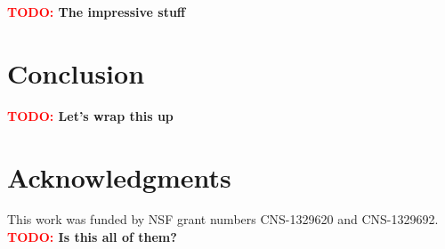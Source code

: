 \documentclass[conference]{IEEEtran}
\newcommand{\TODO}[1]{ {\bf \textcolor{red}{TODO:} #1 }}
\begin{document}
\TODO{The impressive stuff}

\section{Conclusion}

\TODO{Let's wrap this up}

\section*{Acknowledgments}
%
This work was funded by NSF grant numbers CNS-1329620 and CNS-1329692.
\TODO{Is this all of them?}





\end{document}
